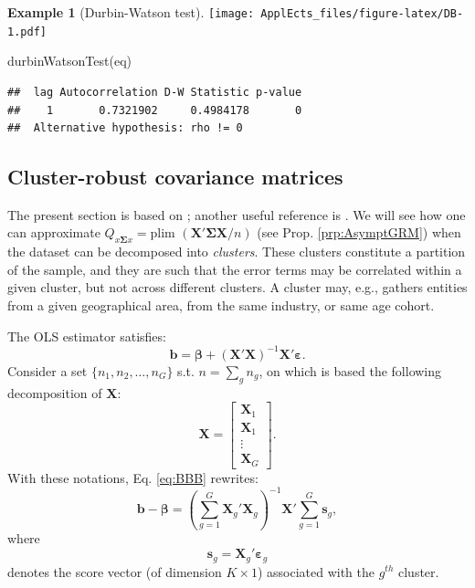 \documentclass[
  12pt,
]{book}
\newenvironment{Shaded}{\begin{snugshade}}{\end{snugshade}}
\newcommand{\FunctionTok}[1]{\textcolor[rgb]{0.00,0.00,0.00}{#1}}
\newcommand{\NormalTok}[1]{#1}
\theoremstyle{definition}
\theoremstyle{definition}
\newtheorem{example}{Example}[chapter]
\theoremstyle{definition}
\theoremstyle{definition}
\theoremstyle{remark}
\begin{document}
\begin{example}[Durbin-Watson test]
\texttt{[image: ApplEcts\_files/figure-latex/DB-1.pdf]}

\begin{Shaded}
\begin{Highlighting}[]
\FunctionTok{durbinWatsonTest}\NormalTok{(eq)}
\end{Highlighting}
\end{Shaded}

\begin{verbatim}
##  lag Autocorrelation D-W Statistic p-value
##    1       0.7321902     0.4984178       0
##  Alternative hypothesis: rho != 0
\end{verbatim}

\end{example}

\hypertarget{Clusters}{%
\subsection{Cluster-robust covariance matrices}\label{Clusters}}

The present section is based on \citet{MACKINNON2022}; another useful reference is \citet{Cameron_Miller_2014}. We will see how one can approximate \(Q_{x\boldsymbol\Sigma x}=\mbox{plim }(\mathbf{X}'\boldsymbol\Sigma\mathbf{X}/n)\) (see Prop. \ref{prp:AsymptGRM}) when the dataset can be decomposed into \emph{clusters}. These clusters constitute a partition of the sample, and they are such that the error terms may be correlated within a given cluster, but not across different clusters. A cluster may, e.g., gathers entities from a given geographical area, from the same industry, or same age cohort.

The OLS estimator satisfies:
\begin{equation}
\mathbf{b} = \boldsymbol\beta + (\mathbf{X}'\mathbf{X})^{-1}\mathbf{X}'\boldsymbol\varepsilon.\label{eq:BBB}
\end{equation}
Consider a set \(\{n_1,n_2,\dots,n_G\}\) s.t. \(n=\sum_g n_g\), on which is based the following decomposition of \(\mathbf{X}\):
\[
\mathbf{X} = \left[
\begin{array}{c}
\mathbf{X}_1 \\
\mathbf{X}_1 \\
\vdots\\
\mathbf{X}_G
\end{array}
\right].
\]
With these notations, Eq. \eqref{eq:BBB} rewrites:
\begin{equation}
\mathbf{b} - \boldsymbol\beta = \left(\sum_{g=1}^G \mathbf{X}_g'\mathbf{X}_g\right)^{-1}\mathbf{X}'\sum_{g=1}^G \mathbf{s}_g,\label{eq:cluster1}
\end{equation}
where
\begin{equation}
\mathbf{s}_g = \mathbf{X}_g'\boldsymbol\varepsilon_g \label{eq:definiS}
\end{equation}
denotes the score vector (of dimension \(K \times 1\)) associated with the \(g^{th}\) cluster.
\end{document}
